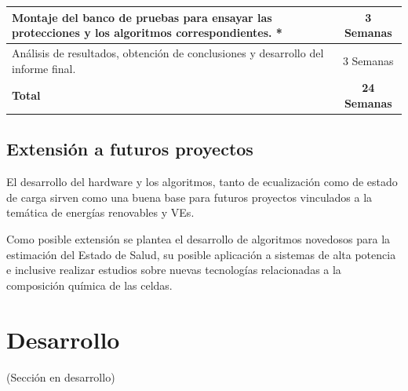\documentclass[10pt,a4paper]{article}
\begin{document}
\begin{table}[h!]
\begin{tabular}{|l|c|}
			Montaje del banco de pruebas para ensayar las protecciones y los algoritmos correspondientes. *                                                                                                                       & 3 Semanas                          \\ \hline
			Análisis de resultados, obtención de conclusiones y desarrollo del informe final.                                                                                                                                                       & 3 Semanas                          \\ \hline
			\textbf{Total}                                                                                                                                                                                                  &\textbf{24 Semanas} \\ \hline
    \end{tabular}
\end{table}

\subsection{Extensión a futuros proyectos}

El desarrollo del hardware y los algoritmos, tanto de ecualización como de
estado de carga sirven como una buena base para futuros proyectos vinculados a
la temática de energías renovables y \acrshort{VE}s.

Como posible extensión se plantea el desarrollo de algoritmos novedosos para la
estimación del Estado de Salud, su posible aplicación a sistemas de alta
potencia e inclusive realizar estudios sobre nuevas tecnologías relacionadas a
la composición química de las celdas.

\newpage

\section{Desarrollo}\label{desarrollo}
(Sección en desarrollo)


\end{document}
